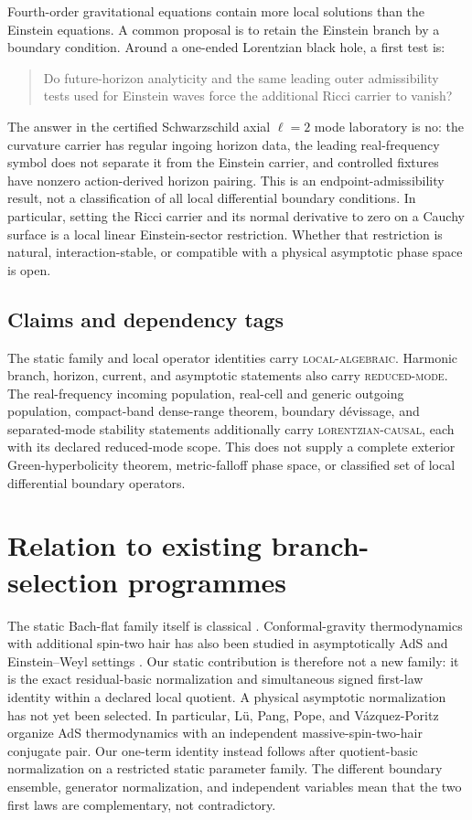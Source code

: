 \documentclass[11pt]{article}
\theoremstyle{definition}
\theoremstyle{remark}
\begin{document}
Fourth-order gravitational equations contain more local solutions than the
Einstein equations.  A common proposal is to retain the Einstein branch by a
boundary condition.  Around a one-ended Lorentzian black hole, a first test
is:

\begin{quote}
Do future-horizon analyticity and the same leading outer admissibility tests
used for Einstein waves force the additional Ricci carrier to vanish?
\end{quote}

The answer in the certified Schwarzschild axial \(\ell=2\) mode laboratory
is no: the curvature carrier has regular ingoing horizon data, the leading
real-frequency symbol does not separate it from the Einstein carrier, and
controlled fixtures have nonzero action-derived horizon pairing.  This is
an endpoint-admissibility result, not a classification of all local
differential boundary conditions.  In particular, setting the Ricci carrier
and its normal derivative to zero on a Cauchy surface is a local linear
Einstein-sector restriction.  Whether that restriction is natural,
interaction-stable, or compatible with a physical asymptotic phase space is
open.

\subsection{Claims and dependency tags}

The static family and local operator identities carry
\textsc{local-algebraic}.  Harmonic branch, horizon, current, and asymptotic
statements also carry \textsc{reduced-mode}.  The real-frequency incoming
population, real-cell and generic outgoing population, compact-band
dense-range theorem, boundary dévissage, and separated-mode stability
statements additionally carry
\textsc{lorentzian-causal}, each with its declared reduced-mode scope.  This
does not supply a complete exterior Green-hyperbolicity theorem,
metric-falloff phase space, or classified set of local differential boundary
operators.

\section{Relation to existing branch-selection programmes}

The static Bach-flat family itself is classical
\cite{Riegert,MannheimKazanas}.  Conformal-gravity thermodynamics with
additional spin-two hair has also been studied in asymptotically AdS and
Einstein--Weyl settings \cite{LuPangPopeVP}.  Our static contribution is
therefore not a new family: it is the exact residual-basic normalization and
simultaneous signed first-law identity within a declared local quotient.  A
physical asymptotic normalization has not yet been selected.  In particular,
L\"u, Pang, Pope, and V\'azquez-Poritz organize AdS thermodynamics with an
independent massive-spin-two-hair conjugate pair.  Our one-term identity
instead follows after quotient-basic normalization on a restricted static
parameter family.  The different boundary ensemble, generator normalization,
and independent variables mean that the two first laws are complementary,
not contradictory.
\end{document}
